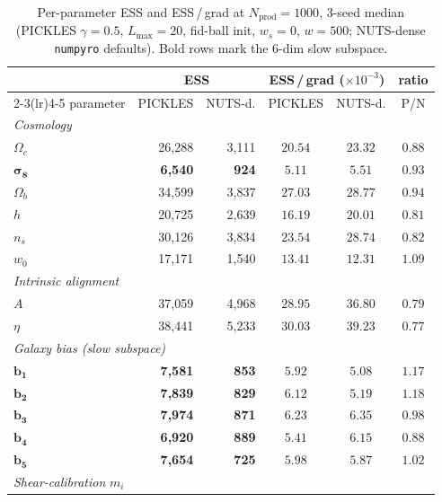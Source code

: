 \documentclass{article}
\begin{document}
\begin{table}[t]
\centering
\caption{Per-parameter ESS and ESS\,/\,grad at $N_{\text{prod}}=1000$,
$3$-seed median (PICKLES $\gamma=0.5$, $L_{\max}=20$, fid-ball init,
$w_s=0$, $w=500$; NUTS-dense \texttt{numpyro} defaults). Bold rows mark
the $6$-dim slow subspace.}
\label{tab:desPerDimEss}
\small
\begin{tabular}{l rr cc c}
\toprule
& \multicolumn{2}{c}{ESS}
& \multicolumn{2}{c}{ESS\,/\,grad ($\times 10^{-3}$)} & ratio \\
\cmidrule(lr){2-3}\cmidrule(lr){4-5}
parameter & PICKLES & NUTS-d. & PICKLES & NUTS-d. & P/N \\
\midrule
\multicolumn{6}{l}{\emph{Cosmology}} \\
$\Omega_c$ & 26{,}288 & 3{,}111 & $20.54$ & $23.32$ & $0.88$ \\
$\boldsymbol{\sigma_8}$ & \textbf{6{,}540} & \textbf{924} & $\mathbf{5.11}$ & $\mathbf{5.51}$ & $0.93$ \\
$\Omega_b$ & 34{,}599 & 3{,}837 & $27.03$ & $28.77$ & $0.94$ \\
$h$        & 20{,}725 & 2{,}639 & $16.19$ & $20.01$ & $0.81$ \\
$n_s$      & 30{,}126 & 3{,}834 & $23.54$ & $28.74$ & $0.82$ \\
$w_0$      & 17{,}171 & 1{,}540 & $13.41$ & $12.31$ & $1.09$ \\
\midrule
\multicolumn{6}{l}{\emph{Intrinsic alignment}} \\
$A$    & 37{,}059 & 4{,}968 & $28.95$ & $36.80$ & $0.79$ \\
$\eta$ & 38{,}441 & 5{,}233 & $30.03$ & $39.23$ & $0.77$ \\
\midrule
\multicolumn{6}{l}{\emph{Galaxy bias (slow subspace)}} \\
$\boldsymbol{b_1}$ & \textbf{7{,}581} & \textbf{853} & $\mathbf{5.92}$ & $\mathbf{5.08}$ & $1.17$ \\
$\boldsymbol{b_2}$ & \textbf{7{,}839} & \textbf{829} & $\mathbf{6.12}$ & $\mathbf{5.19}$ & $1.18$ \\
$\boldsymbol{b_3}$ & \textbf{7{,}974} & \textbf{871} & $\mathbf{6.23}$ & $\mathbf{6.35}$ & $0.98$ \\
$\boldsymbol{b_4}$ & \textbf{6{,}920} & \textbf{889} & $\mathbf{5.41}$ & $\mathbf{6.15}$ & $0.88$ \\
$\boldsymbol{b_5}$ & \textbf{7{,}654} & \textbf{725} & $\mathbf{5.98}$ & $\mathbf{5.87}$ & $1.02$ \\
\midrule
\multicolumn{6}{l}{\emph{Shear-calibration} $m_i$} \\

\end{tabular}
\end{table}
\end{document}
